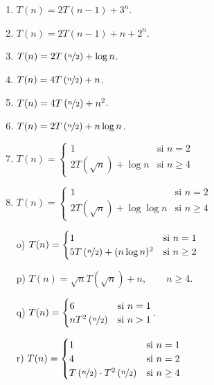 \begin{ejercicio}
\begin{enumerate}[label=\alph*)]
        \item $T(n)=2T(n-1) + 3^n$.
        \item $T(n)=2T(n-1) + n+2^n$.
        \item $T(n)=2T\left(\nicefrac{n}{2}\right) + \log n$.
        \item $T(n)=4T\left(\nicefrac{n}{2}\right) + n$.
        \item $T(n)=4T\left(\nicefrac{n}{2}\right) + n^2$.
        \item $T(n)=2T\left(\nicefrac{n}{2}\right) + n\log n$.
        \item $T(n) = \begin{cases}
            1 & \text{si } n = 2 \\
            2T\left(\sqrt{n}\right) + \log n & \text{si } n \geq 4
        \end{cases}$

        \item $T(n) = \begin{cases}
            1 & \text{si } n = 2 \\
            2T\left(\sqrt{n}\right) + \log \log n & \text{si } n \geq 4
        \end{cases}$

        \item[o)] $T(n) = \begin{cases}
            1 & \text{si } n = 1 \\
            5T\left(\nicefrac{n}{2}\right) + (n\log n)^2 & \text{si } n \geq 2
        \end{cases}$

        \item[p)] $T(n)=\sqrt{n} T\left(\sqrt{n}\right) + n,\qquad n\geq 4$.
        \item[q)] $T(n)=\begin{cases}
            6 & \text{si } n=1 \\
            nT^2\left(\nicefrac{n}{2}\right) & \text{si } n>1
        \end{cases}$.

        \item[r)] $T(n) = \begin{cases}
            1 & \text{si } n = 1 \\
            4 & \text{si } n = 2 \\
            T\left(\nicefrac{n}{2}\right) \cdot T^2\left(\nicefrac{n}{2}\right) & \text{si } n \geq 4
        \end{cases}$
    \end{enumerate}
\end{ejercicio}


